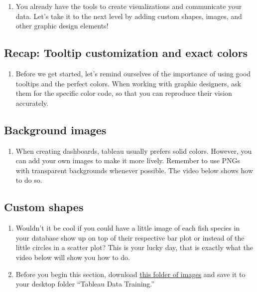 \documentclass[
]{book}
\providecommand{\tightlist}{%
  \setlength{\itemsep}{0pt}\setlength{\parskip}{0pt}}
\begin{document}
\begin{enumerate}
\def\labelenumi{\arabic{enumi}.}
\tightlist
\item
  You already have the tools to create visualizations and communicate your data. Let's take it to the next level by adding custom shapes, images, and other graphic design elements!
\end{enumerate}

\hypertarget{recap-tooltip-customization-and-exact-colors}{%
\subsection{Recap: Tooltip customization and exact colors}\label{recap-tooltip-customization-and-exact-colors}}

\begin{enumerate}
\def\labelenumi{\arabic{enumi}.}
\tightlist
\item
  Before we get started, let's remind ourselves of the importance of using good tooltips and the perfect colors. When working with graphic designers, ask them for the specific color code, so that you can reproduce their vision accurately.
\end{enumerate}

\hypertarget{background-images}{%
\subsection{Background images}\label{background-images}}

\begin{enumerate}
\def\labelenumi{\arabic{enumi}.}
\tightlist
\item
  When creating dashboards, tableau usually prefers solid colors. However, you can add your own images to make it more lively. Remember to use PNGs with transparent backgrounds whenever possible. The video below shows how to do so.
\end{enumerate}

\hypertarget{custom-shapes}{%
\subsection{Custom shapes}\label{custom-shapes}}

\begin{enumerate}
\def\labelenumi{\arabic{enumi}.}
\item
  Wouldn't it be cool if you could have a little image of each fish species in your database show up on top of their respective bar plot or instead of the little circles in a scatter plot? This is your lucky day, that is exactly what the video below will show you how to do.
\item
  Before you begin this section, download \href{https://github.com/NCEAS/data-training-picrc-cos/raw/main/images/TNC\%20-\%20Fish\%20Images.zip}{this folder of images} and save it to your desktop folder ``Tableau Data Training.''
\end{enumerate}
\end{document}
